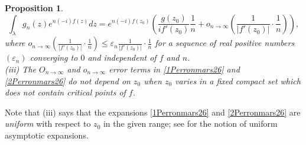 \documentclass[11pt]{amsart}
\newtheorem{prop}[teo]{Proposition}
\begin{document}
{\begin{prop}
\begin{equation}\label{2Perronmars26}\int_{\lambda} g_n(z) e^{n (-i) f(z)} dz =  e^{n (-i) f(z_0)} \left (\dfrac{g(z_0)}{i f'(z_0)}\dfrac{1}{n}+ o_{n \to \infty}\left(\dfrac{1}{\vert f'(z_0)\vert}\cdot \frac{1}{n}\right) \right ),
\end{equation}
where $\textstyle o_{n \to \infty}\left(\frac{1}{\vert f'(z_0)\vert}\cdot \frac{1}{n}\right) \leq \varepsilon_n \frac{1}{\vert f'(z_0)\vert}\cdot \frac{1}{n}$ for a sequence of real positive numbers $(\varepsilon_n)$ converging to $0$ and independent of $f$ and $n$.\\
(iii) The $\textstyle O_{n \to \infty}$ and $\textstyle o_{n \to \infty}$ error terms in \eqref{1Perronmars26} and \eqref{2Perronmars26} do not depend on $z_0$ when $z_0$ varies in a fixed compact set which does not contain critical points of $f$.
\end{prop}
Note that (iii) says that the expansions \eqref{1Perronmars26} and \eqref{2Perronmars26} are {\it uniform} with respect to $z_0$ in the given range; see \cite[Chapter VII]{W} for the notion of uniform asymptotic expansions.
\medskip

}
\end{document}
